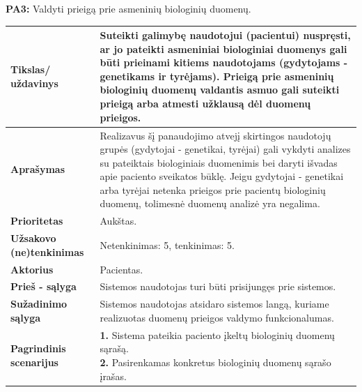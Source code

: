 \documentclass[12pt]{article}
\begin{document}
\newpage

\noindent \textbf{PA3:} Valdyti prieigą prie asmeninių biologinių duomenų.
\label{sec:PA3}
\begin{table}[htb!]
    \captionsetup{justification=centering}
    \begin{tabular}{|m{3cm}|m{13.7cm}|}
        \hline
        \raggedleft \textbf{\cellcolor{deepchampagne}Tikslas/ uždavinys} &
        Suteikti galimybę naudotojui (pacientui) nuspręsti, ar jo pateikti
        asmeniniai biologiniai duomenys gali būti prieinami kitiems
        naudotojams (gydytojams - genetikams ir tyrėjams). Prieigą prie
        asmeninių biologinių duomenų valdantis asmuo gali suteikti prieigą arba
        atmesti užklausą dėl duomenų prieigos. \\
        \hline
        \raggedleft \textbf{\cellcolor{deepchampagne}Aprašymas} &
        Realizavus šį panaudojimo atvejį skirtingos naudotojų grupės
        (gydytojai - genetikai, tyrėjai) gali vykdyti analizes su pateiktais
        biologiniais duomenimis bei daryti išvadas apie paciento sveikatos
        būklę. Jeigu gydytojai - genetikai arba tyrėjai netenka prieigos
        prie pacientų biologinių duomenų, tolimesnė duomenų analizė yra
        negalima. \\
        \hline
        \raggedleft \textbf{\cellcolor{deepchampagne}Prioritetas} & Aukštas. \\
        \hline
        \raggedleft \textbf{\cellcolor{deepchampagne}Užsakovo (ne)tenkinimas} &
        Netenkinimas: 5, tenkinimas: 5. \\
        \hline
        \raggedleft \textbf{\cellcolor{deepchampagne}Aktorius} &
        Pacientas. \\
        \hline
        \raggedleft \textbf{\cellcolor{deepchampagne}Prieš - sąlyga} &
        Sistemos naudotojas turi būti prisijungęs prie sistemos. \\
        \hline
        \raggedleft \textbf{\cellcolor{deepchampagne}Sužadinimo sąlyga} &
        Sistemos naudotojas atsidaro sistemos langą, kuriame realizuotas duomenų
        prieigos valdymo funkcionalumas. \\
        \hline
        \raggedleft \textbf{\cellcolor{deepchampagne}Pagrindinis
        scenarijus} & \vskip 5pt
        \makecell[l]{\parbox[t]{13.7cm}{
            \textbf{1.} {Sistema pateikia paciento
            įkeltų biologinių duomenų sąrašą.} \\
            \textbf{2.} \textcolor{dartmouthgreen}{Pasirenkamas konkretus
            biologinių duomenų sąrašo įrašas.} \\
}}
\end{tabular}
\end{table}
\end{document}
